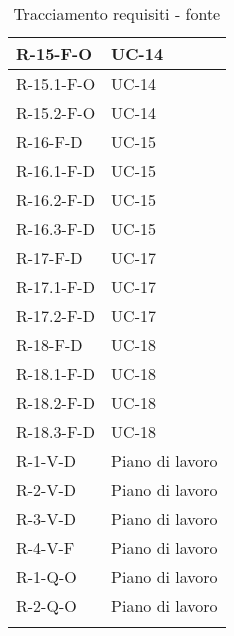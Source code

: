 \begin{center}
\begin{longtable}{| C{6cm} |C{6cm}|}
        R-15-F-O & UC-14\\\hline
        R-15.1-F-O & UC-14\\\hline
        R-15.2-F-O & UC-14\\\hline
        R-16-F-D & UC-15 \\\hline
        R-16.1-F-D & UC-15 \\\hline
        R-16.2-F-D & UC-15 \\\hline
        R-16.3-F-D & UC-15 \\\hline
        R-17-F-D & UC-17 \\\hline
        R-17.1-F-D & UC-17 \\\hline
        R-17.2-F-D & UC-17 \\\hline
        R-18-F-D & UC-18 \\\hline
        R-18.1-F-D & UC-18 \\\hline
        R-18.2-F-D & UC-18 \\\hline
        R-18.3-F-D & UC-18 \\\hline
        R-1-V-D& Piano di lavoro\\\hline
        R-2-V-D& Piano di lavoro\\\hline
        R-3-V-D& Piano di lavoro\\\hline
        R-4-V-F& Piano di lavoro\\\hline
        R-1-Q-O& Piano di lavoro\\\hline
        R-2-Q-O& Piano di lavoro\\\hline
        \caption{Tracciamento requisiti - fonte}
    \end{longtable}
\end{center}